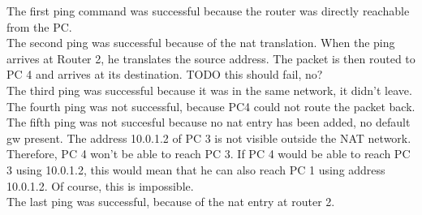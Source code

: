 
The first ping command was successful because the router was directly reachable from the PC. \\
The second ping was successful because of the nat translation. When the ping arrives at Router 2, he translates the source address. The packet is then routed to PC 4 and arrives at its destination. TODO this should fail, no? \\
The third ping was successful because it was in the same network, it didn't leave. \\
The fourth ping was not successful, because PC4 could not route the packet back. \\
The fifth ping was not succesful because no nat entry has been added, no default gw present. The address 10.0.1.2 of PC 3 is not visible outside the NAT network. Therefore, PC 4 won't be able to reach PC 3. If PC 4 would be able to reach PC 3 using 10.0.1.2, this would mean that he can also reach PC 1 using address 10.0.1.2. Of course, this is impossible. \\

The last ping was successful, because of the nat entry at router 2.